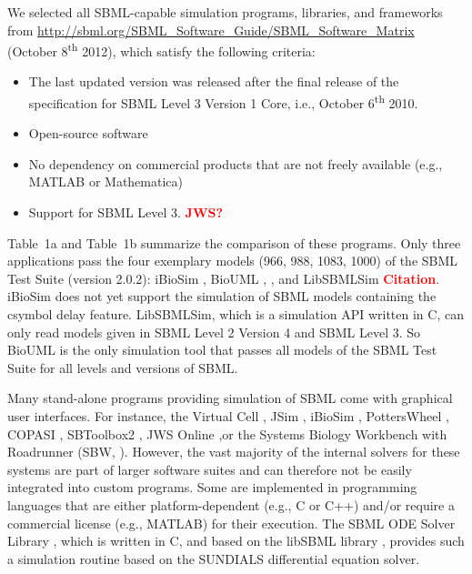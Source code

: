 \documentclass[10pt]{bmc_article}
\newenvironment{bmcformat}{\baselineskip20pt\sloppy\setboolean{publ}{false}}{\baselineskip20pt\sloppy}
\newcommand{\TODO}[1]{\textcolor{red}{\textbf{#1}}}
\begin{document}
\begin{bmcformat}
We selected all SBML-capable simulation programs, libraries, and frameworks from
\url{http://sbml.org/SBML_Software_Guide/SBML_Software_Matrix} (October
8\textsuperscript{th} 2012), which satisfy the following criteria:
\begin{itemize}
  \item The last updated version was released after the final release of
  the specification for SBML Level 3 Version 1 Core, i.e., October
  6\textsuperscript{th} 2010.
  \item Open-source software
  \item No dependency on commercial products that are not freely available
  (e.g., MATLAB\texttrademark{} or Mathematica\texttrademark)
  \item Support for SBML Level 3.   \TODO{JWS?}
\end{itemize}
Table~1a and Table~1b summarize the comparison of these programs. Only three applications pass the four exemplary models (966, 988, 1083, 1000) of the SBML Test Suite (version 2.0.2): iBioSim \cite{Myers2009}, BioUML \cite{Kolpakov2011}, \cite{Kolpakov2006}, and LibSBMLSim \TODO{Citation}. iBioSim does not yet support the simulation of SBML models containing the csymbol delay feature. LibSBMLSim, which is a simulation API written in C, can only read models given in SBML Level 2 Version 4 and SBML Level 3. So BioUML is the only simulation tool that passes all models of the SBML Test Suite for all levels and versions of SBML.

Many stand-alone programs providing simulation of SBML come with
graphical user interfaces.
For instance, the Virtual Cell \cite{Loew2001}, JSim \cite{Beard2012a}, iBioSim \cite{Myers2009},
PottersWheel \cite{Maiwald2008}, COPASI \cite{Hoops2006}, SBToolbox2
\cite{SBT_Schmidt2006}, JWS Online \cite{Olivier2004},or the Systems Biology Workbench with Roadrunner (SBW, \cite{Bergmann06}). 
However, the vast majority of the internal solvers for these systems are part of
larger software suites and can therefore not be easily integrated into custom
programs. Some are implemented in programming languages that are either
platform-dependent (e.g., C or C++) and/or require a commercial license (e.g.,
MATLAB\texttrademark{}) for their execution.
The SBML ODE Solver Library \cite{Machne2006}, which is written in C,
and based on the libSBML library \cite{Bornstein2008}, 
provides such a simulation routine based on the SUNDIALS differential equation
solver.


\end{bmcformat}
\end{document}
